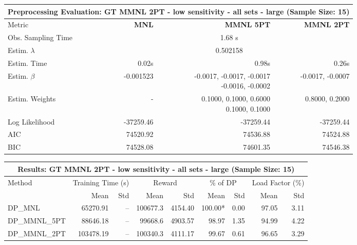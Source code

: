 
\begin{samepage}
\begin{center}
  \small
  \begin{tabular}{l|r|r|r}
    \toprule
    \multicolumn{4}{c}{\textbf{Preprocessing Evaluation: GT MMNL 2PT - low sensitivity - all sets - large (Sample Size: 15)}} \\
    \midrule
    Metric & \textbf{MNL} & \textbf{MMNL 5PT} & \textbf{MMNL 2PT} \\
    \midrule
    Obs. Sampling Time & \multicolumn{3}{c}{1.68 s} \\
    Estim. $\lambda$ & \multicolumn{3}{c}{0.502158} \\
    Estim. Time & 0.02s & 0.98s & 0.26s \\
    Estim. $\beta$ & -0.001523 & \makecell[tr]{-0.0017, -0.0017, -0.0017 \\ -0.0016, -0.0002} & -0.0017, -0.0007 \\
    Estim. Weights & - & \makecell[tr]{0.1000, 0.1000, 0.6000 \\ 0.1000, 0.1000} & 0.8000, 0.2000 \\
    Log Likelihood & -37259.46 & -37259.44 & -37259.44 \\
    AIC & 74520.92 & 74536.88 & 74524.88 \\
    BIC & 74528.08 & 74601.35 & 74546.38 \\
    \bottomrule
  \end{tabular}
\end{center}
\begin{center}
  \small
  \begin{tabular}{l|rr|rr|rr|rr}
    \toprule
    \multicolumn{9}{c}{\textbf{Results: GT MMNL 2PT - low sensitivity - all sets - large (Sample Size: 15)}} \\
    \midrule
    Method & \multicolumn{2}{c|}{Training Time (s)} & \multicolumn{2}{c|}{Reward} & \multicolumn{2}{c|}{\% of DP} & \multicolumn{2}{c}{Load Factor (\%)} \\
    & Mean & Std & Mean & Std & Mean & Std & Mean & Std \\
    \midrule
    DP\_MNL      & 65270.91 &    -- &   100677.3 &    4154.40 & 100.00* &    0.00 &   97.05 &    3.11 \\
    DP\_MMNL\_5PT & 88646.18 &    -- &    99668.6 &    4903.57 &   98.97 &    1.35 &   94.99 &    4.22 \\
    DP\_MMNL\_2PT & 103478.19 &    -- &   100340.3 &    4111.17 &   99.67 &    0.61 &   96.65 &    3.29 \\

\end{tabular}
\end{center}
\end{samepage}
